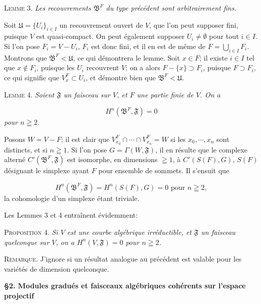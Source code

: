 \textsc{Lemme} 3. \textit{Les recouvrements $\mathfrak{B}^F$ du type précédent sont arbitrairement fins.}

Soit $\mathfrak{U} = \{U_i\}_{i \in I}$ un recouvrement ouvert de $V$, que l'on peut supposer fini, puisque $V$ est quasi-compact. On peut également supposer $U_i \neq \emptyset$ pour tout $i \in I$. Si l'on pose $F_i = V - U_i$, $F_i$ est donc fini, et il en est de même de $F = \bigcup_{i \in I} F_i$. Montrons que $\mathfrak{B}^F < \mathfrak{U}$, ce qui démontrera le lemme. Soit $x \in F$; il existe $i \in I$ tel que $x \notin F_i$, puisque les $U_i$ recouvrent $V$; on a alors $F - \{x\} \supset F_i$, puisque $F \supset F_i$, ce qui signifie que $V_x^F \subset U_i$, et démontre bien que $\mathfrak{B}^F < \mathfrak{U}$.



\textsc{Lemme} 4. \textit{Soient $\mathfrak{F}$ un faisceau sur $V$, et $F$ une partie finie de $V$. On a}

\begin{equation*}
H^n(\mathfrak{B}^F, \mathfrak{F}) = 0
\end{equation*}
\textit{pour $n \geqq 2$.}

Posons $W = V - F$; il est clair que $V_{x_0}^F \cap \cdots \cap V_{x_n}^F = W$ si les $x_0, \cdots, x_n$ sont distincts, et si $n \geqq 1$. Si l'on pose $G = \Gamma(W, \mathfrak{F})$, il en résulte que le complexe alterné $C'(\mathfrak{B}^F, \mathfrak{F})$ est isomorphe, en dimensions $\geqq 1$, à $C'(S(F), G)$, $S(F)$ désignant le simplexe ayant $F$ pour ensemble de sommets. Il s'ensuit que

\begin{equation*}
H^n(\mathfrak{B}^F, \mathfrak{F}) = H^n(S(F), G) = 0 \text{ pour } n \geqq 2,
\end{equation*}
la cohomologie d'un simplexe étant triviale.

Les Lemmes 3 et 4 entraînent évidemment:

\textsc{Proposition} 4. \textit{Si $V$ est une courbe algébrique irréductible, et $\mathfrak{F}$ un faisceau quelconque sur $V$, on a $H^n(V, \mathfrak{F}) = 0$ pour $n \geqq 2$.}

\textsc{Remarque}. J'ignore si un résultat analogue au précédent est valable pour les variétés de dimension quelconque.


\textbf{\S2. Modules gradués et faisceaux algébriques cohérents sur l'espace projectif}

